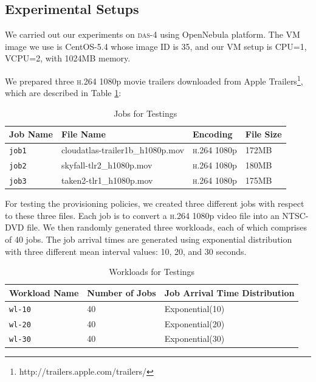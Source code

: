 \subsection{Experimental Setups}
We carried out our experiments on \textsc{das-4} using OpenNebula
platform. The VM image we use is CentOS-5.4 whose image ID is 35, and
our VM setup is CPU=1, VCPU=2, with 1024MB memory.

We prepared three \textsc{h.264} 1080p movie trailers downloaded from
Apple Trailers\footnote{http://trailers.apple.com/trailers/}, which
are described in Table \ref{table_joblist}:

\begin{table}[!t]
  \caption{Jobs for Testings}
  \label{table_joblist}
  \centering
  \begin{tabular}{|l|l|l|l|}
    \hline
    Job Name & File Name & Encoding & File Size\\
    \hline
    \texttt{job1} & cloudatlas-trailer1b\_h1080p.mov & \textsc{h.264} 1080p & 172MB \\
    \hline
    \texttt{job2} & skyfall-tlr2\_h1080p.mov & \textsc{h.264} 1080p & 180MB \\
    \hline
    \texttt{job3} & taken2-tlr1\_h1080p.mov & \textsc{h.264} 1080p & 175MB \\
    \hline
  \end{tabular}
\end{table}

For testing the provisioning policies, we created three different jobs
with respect to these three files. Each job is to convert a \textsc{h.264}
1080p video file into an NTSC-DVD file. We then randomly generated
three workloads, each of which comprises of 40 jobs. The job arrival
times are generated using exponential distribution with three
different mean interval values: 10, 20, and 30 seconds.

\begin{table}[!t]
  \caption{Workloads for Testings}
  \label{table_workloadlist}
  \centering
  \begin{tabular}{|l|l|l|}
    \hline
    Workload Name & Number of Jobs & Job Arrival Time Distribution \\
    \hline
    \texttt{wl-10} & 40 & Exponential(10) \\
    \hline
    \texttt{wl-20} & 40 & Exponential(20) \\
    \hline
    \texttt{wl-30} & 40 & Exponential(30) \\
    \hline
  \end{tabular}
\end{table}


